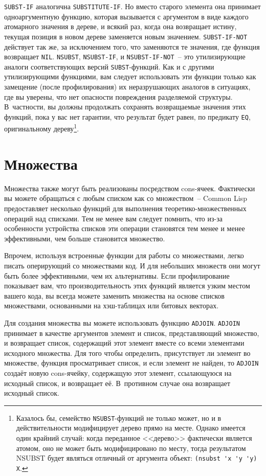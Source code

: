 \lstinline{SUBST-IF} аналогична \lstinline{SUBSTITUTE-IF}. Но вместо старого элемента она принимает
одноаргументную функцию, которая вызывается с аргументом в виде каждого атомарного
значения в дереве, и всякий раз, когда она возвращает истину, текущая позиция в новом
дереве заменяется новым значением. \lstinline{SUBST-IF-NOT} действует так же, за исключением
того, что заменяются те значения, где функция возвращает \lstinline{NIL}. \lstinline{NSUBST},
\lstinline{NSUBST-IF}, и \lstinline{NSUBST-IF-NOT}~-- это утилизирующие аналоги соответствующих
версий \lstinline{SUBST}-функций. Как и с другими утилизирующими функциями, вам следует
использовать эти функции только как замещение (после профилирования) их неразрушающих
аналогов в ситуациях, где вы уверены, что нет опасности повреждения разделяемой
структуры. В~частности, вы должны продолжать сохранять возвращаемые значения этих функций,
пока у вас нет гарантии, что результат будет равен, по предикату \lstinline{EQ}, оригинальному
дереву\footnote{Казалось бы, семейство \lstinline{NSUBST}-функций не только может, но и в
  действительности модифицирует дерево прямо на месте. Однако имеется один крайний случай:
  когда переданное <<дерево>> фактически является атомом, оно не может быть модифицировано
  по месту, тогда результатом NSUBST будет являться отличный от аргумента объект:
  \lstinline!(nsubst 'x 'y 'y) X!.}.

\section{Множества}

Множества также могут быть реализованы посредством cons-ячеек. Фактически вы можете
обращаться с любым списком как со множеством~-- Common Lisp предоставляет несколько функций
для выполнения теоретико-множественных операций над списками. Тем не менее вам следует
помнить, что из-за особенности устройства списков эти операции становятся тем менее и
менее эффективными, чем больше становится множество.

Впрочем, используя встроенные функции для работы со множествами, легко писать оперирующий со
множествами код. И для небольших множеств они могут быть более эффективными, чем их
альтернативы. Если профилирование показывает вам, что производительность этих функций
является узким местом вашего кода, вы всегда можете заменить множества на основе списков
множествами, основанными на хэш-таблицах или битовых векторах.

Для создания множества вы можете использовать функцию \lstinline{ADJOIN}. \lstinline{ADJOIN}
принимает в качестве аргументов элемент и список, представляющий множество, и возвращает
список, содержащий этот элемент вместе со всеми элементами исходного множества.  Для того
чтобы определить, присутствует ли элемент во множестве, функция просматривает список, и
если элемент не найден, то \lstinline{ADJOIN} создаёт новую cons-ячейку, содержащую этот
элемент, ссылающуюся на исходный список, и возвращает её. В~противном случае она
возвращает исходный список.

